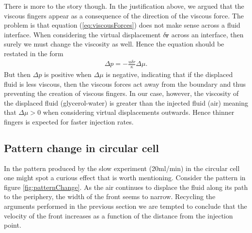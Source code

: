 \documentclass[twoside,utf8]{article}
\newcommand{\EQU}[1] { \begin{equation*} \begin{split} #1 \end{split} \end{equation*} }
\begin{document}
There is more to the story though. In the justification above, we argued that the viscous fingers appear as a consequence of the direction of the viscous force. The problem is that equation (\ref{eq:viscousForces}) does not make sense across a fluid interface. When considering the virtual displacement $\delta \mathbf{r}$ across an interface, then surely we must change the viscosity as well. Hence the equation should be restated in the form
\EQU{
\Delta p = -\frac{u \delta r }{\kappa}\Delta \mu.
}
But then $\Delta p$ is positive when $\Delta \mu$ is negative, indicating that if the displaced fluid is less viscous, then the viscous forces act away from the boundary and thus preventing the creation of viscous fingers. In our case, however, the viscosity of the displaced fluid (glycerol-water) is greater than the injected fluid (air) meaning that $\Delta \mu>0$ when considering virtual displacements outwards. Hence thinner fingers is expected for faster injection rates.



\begin{comment}
We could go on with the discussion by considering similar flow in a non-porous medium, what the effect of making a cell with varying porosity $\kappa$ would be, or how the pattern is expected to change if the medium is replaced with a perfectly ordered grid. This is omitted due to the limited scope of this text.

\begin{figure}[H]
	\texttt{[image: ForText/ComparisonFast.png]}
	\texttt{[image: ForText/ComparisonSlow.png]}
	\caption{The state difference between the initial and final setup for two experiments with different injection speeds. In the experiment depicted to the left 35 ml of air was injected per minute. To the right, the rate was decreased to 20 ml/min.  }
	\label{fig:displacement}
\end{figure}
\end{comment}






\subsection{Pattern change in circular cell}

In the pattern produced by the slow experiment (20ml/min) in the circular cell one might spot a curious effect that is worth mentioning. Consider the pattern in figure \ref{fig:patternChange}. As the air continues to displace the fluid along its path to the periphery, the width of the front seems to narrow. Recycling the arguments performed in the previous section we are tempted to conclude that the velocity of the front increases as a function of the distance from the injection point.
\end{document}

